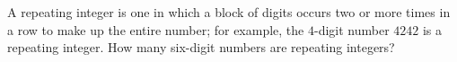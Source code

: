 A repeating integer is one in which a block of digits occurs two or more times in a row to make up the entire number; for example, the $4$-digit number $4242$ is a repeating integer. How many six-digit numbers are repeating integers?
